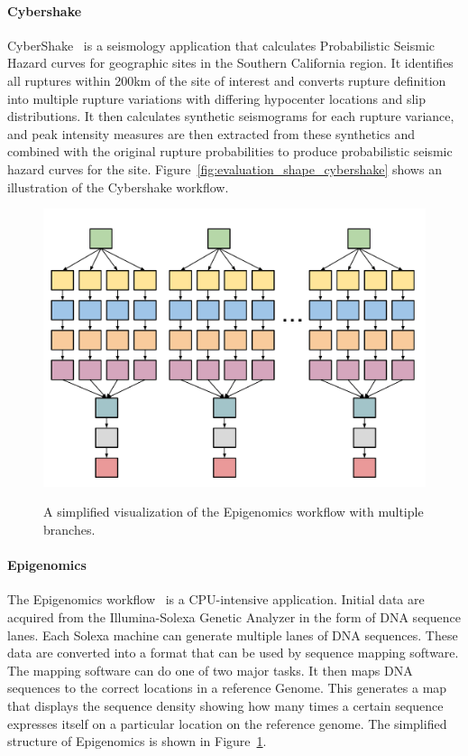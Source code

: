 \documentclass{IOS-Book-Article}
\begin{document}
\paragraph{\textbf{Cybershake}}
CyberShake~\cite{Graves2010} is a seismology application that calculates Probabilistic Seismic Hazard curves for geographic sites in the Southern California region. It identifies all ruptures within 200km of the site of interest and converts rupture definition into multiple rupture variations with differing hypocenter locations and slip distributions. It then calculates synthetic seismograms for each rupture variance, and peak intensity measures are then extracted from these synthetics and combined with the original rupture probabilities to produce probabilistic seismic hazard curves for the site. Figure~\ref{fig:evaluation_shape_cybershake} shows an illustration of the Cybershake workflow.

\begin{figure}[htb]
	\centering
	\includegraphics[width=0.8\linewidth]{genome_shape.pdf} \\
	\caption{A simplified visualization of the Epigenomics workflow with multiple branches.}
	\label{fig:evaluation_shape_genome}
\end{figure}

\paragraph{\textbf{Epigenomics}}
The Epigenomics workflow~\cite{Epigenome} is a CPU-intensive application. Initial data are acquired from the Illumina-Solexa Genetic Analyzer in the form of DNA sequence lanes. Each Solexa machine can generate multiple lanes of DNA sequences. These data are converted into a format that can be used by sequence mapping software. The mapping software can do one of two major tasks. It then maps DNA sequences to the correct locations in a reference Genome. This generates a map that displays the sequence density showing how many times a certain sequence expresses itself on a particular location on the reference genome. The simplified structure of Epigenomics is shown in Figure~\ref{fig:evaluation_shape_genome}. 
\end{document}
